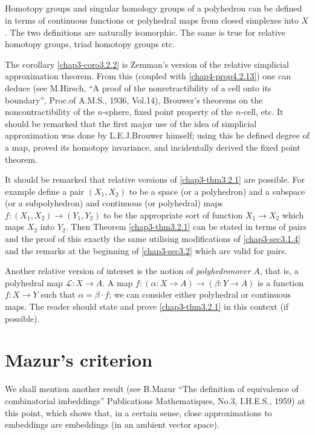 \subsection{}\label{chap3-sec3.2.4}
Homotopy groups and singular homology groups of a polyhedron can be defined in terms of continuous functions or polyhedral maps from closed simplexes into $X$. The two definitions are naturally isomorphic. The same is true for relative homotopy groups, triad homotopy groups etc.

The corollary \ref{chap3-coro3.2.2} is Zemman's version of the relative simplicial approximation theorem. From this (coupled with \ref{chap4-prop4.2.13}) one can deduce (see M.\@ Hirsch, ``A proof of the nonretractibility of a cell onto its boundary'', Proc.\@ of A.M.S., 1936, Vol.\@ 14), Brouwer's theorems on the noncontractibility of the $n$-sphere, fixed point property of the $n$-cell, etc. It should be remarked that the first major use of the idea of simplicial approximation was done by L.E.J.\@ Brouwer himself; using this he defined degree of a map, proved its homotopy invariance, and incidentally derived the fixed point theorem.

It should be remarked that relative versions of \ref{chap3-thm3.2.1} are possible. For example define a pair $(X_{1},X_{2})$ to be a space (or a polyhedron) and a subspace (or a subpolyhedron) and continuous (or polyhedral) maps $f:(X_{1},X_{2})\to (Y_{1},Y_{2})$ to be the appropriate sort of function $X_{1}\to X_{2}$ which maps $X_{2}$ into $Y_{2}$. Then Theorem \ref{chap3-thm3.2.1} can be stated in terms of pairs and the proof of this exactly the same utilising modifications of \ref{chap3-sec3.1.4} and the remarks at the beginning of \ref{chap3-sec3.2} which are valid for pairs.

Another relative version of interset is the notion of {\em polyhedron\pageoriginale over $A$}, that is, a polyhedral map $\mathcal{L}:X\to A$. A map $f:(\alpha:X\to A)\to (\beta:Y\to A)$ is a function $f:X\to Y$ such that $\alpha=\beta\cdot f$; we can consider either polyhedral or continuous maps. The reader should state and prove \ref{chap3-thm3.2.1} in this context (if possible).

\section{Mazur's criterion}\label{chap3-sec3.3}

We shall mention another result (see B.\@ Mazur ``The definition of equivalence of combinatorial imbeddings'' Publications Mathematiques, No.3, I.H.E.S., 1959) at this point, which shows that, in a certain sense, close approximations to embeddings are embeddings (in an ambient vector space).

